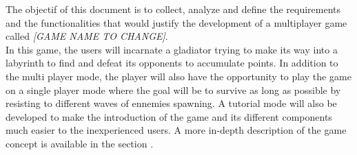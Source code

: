 The objectif of this document is to collect, analyze and define the requirements and the functionalities that would justify the development of a multiplayer game called \textit{[GAME NAME TO CHANGE]}. \\

In this game, the users will incarnate a gladiator trying to make its way into a labyrinth to find and defeat its opponents to accumulate points. In addition to the multi player mode, the player will also have the opportunity to play the game on a single player mode where the goal will be to survive as long as possible by resisting to different waves of ennemies spawning. A tutorial mode will also be developed to make the introduction of the game and its different components much easier to the inexperienced users. A more in-depth description of the game concept is available in the section .
